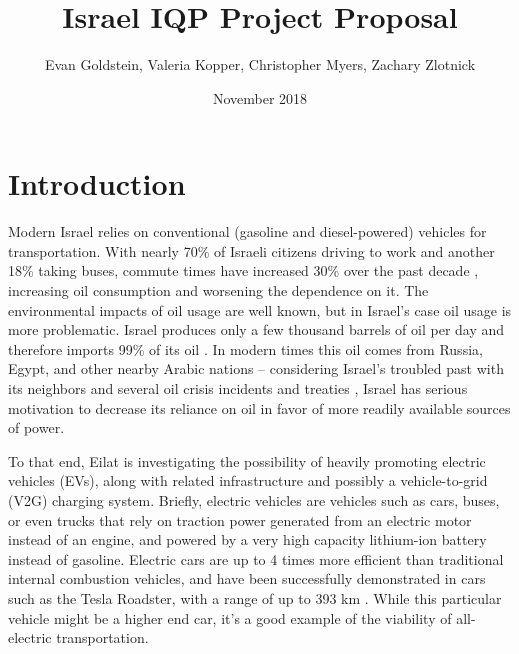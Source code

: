 \documentclass{article}                         %
\title{Israel IQP Project Proposal}
\author{Evan Goldstein, Valeria Kopper, Christopher Myers, Zachary Zlotnick}
\date{November 2018}
\begin{document}
\maketitle
\newpage

\renewcommand\abstractname{Summary} %

\tableofcontents
\bigskip
\noindent\makebox[\linewidth]{\rule{7.5in}{0.2pt}}
\listofauthorships
\newpage
{}
\doublespacing

\section{Introduction}

Modern Israel relies on conventional (gasoline and diesel-powered) vehicles for transportation. With nearly 70\% of Israeli citizens driving to work and another 18\% taking buses, commute times have increased 30\% over the past decade \cite{Dori2018IsraeliRoads}, increasing oil consumption and worsening the dependence on it. The environmental impacts of oil usage are well known, but in Israel's case oil usage is more problematic. Israel produces only a few thousand barrels of oil per day and therefore imports 99\% of its oil \cite{Engber2006WhereOil}. In modern times this oil comes from Russia, Egypt, and other nearby Arabic nations -- considering Israel's troubled past with its neighbors and several oil crisis incidents and treaties \cite{Engber2006WhereOil}, Israel has serious motivation to decrease its reliance on oil in favor of more readily available sources of power.

To that end, Eilat is investigating the possibility of heavily promoting electric vehicles (EVs), along with related infrastructure and possibly a vehicle-to-grid (V2G) charging system. Briefly, electric vehicles are vehicles such as cars, buses, or even trucks that rely on traction power generated from an electric motor instead of an engine, and powered by a very high capacity lithium-ion battery instead of gasoline. Electric cars are up to 4 times more efficient than traditional internal combustion vehicles, and have been successfully demonstrated in cars such as the Tesla Roadster, with a range of up to 393 km \cite{Friel2010ManagementVehicles}. While this particular vehicle might be a higher end car, it's a good example of the viability of all-electric transportation.
\end{document}
